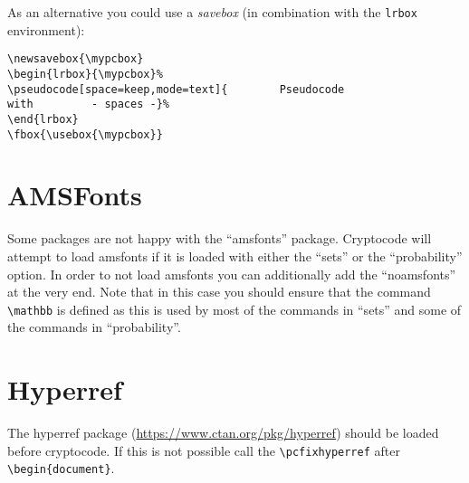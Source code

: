 \documentclass[a4paper]{report}
\begin{document}
As an alternative you could use a \emph{savebox} (in combination with the \lstinline$lrbox$ environment):
 
\newsavebox{\mypcbox}
\begin{lrbox}{\mypcbox}%
%
\end{lrbox}
\fbox{\usebox{\mypcbox}}

\begin{lstlisting}
\newsavebox{\mypcbox}
\begin{lrbox}{\mypcbox}%
\pseudocode[space=keep,mode=text]{        Pseudocode                with         - spaces -}%
\end{lrbox}
\fbox{\usebox{\mypcbox}}
\end{lstlisting}

\section{AMSFonts}
Some packages are not happy with the \enquote{amsfonts} package. Cryptocode will attempt to load amsfonts if it is loaded
with either the \enquote{sets} or the \enquote{probability} option. In order to not load amsfonts you can additionally add the
\enquote{noamsfonts} at the very end. Note that in this case you should ensure that the command \lstinline$\mathbb$ is defined
as this is used by most of the commands in \enquote{sets} and some of the commands in \enquote{probability}.

\section{Hyperref}
The hyperref package (\url{https://www.ctan.org/pkg/hyperref}) should be loaded before cryptocode. If this is not possible
call the \lstinline$\pcfixhyperref$ after \lstinline$\begin{document}$. 

\printindex
\end{document}
